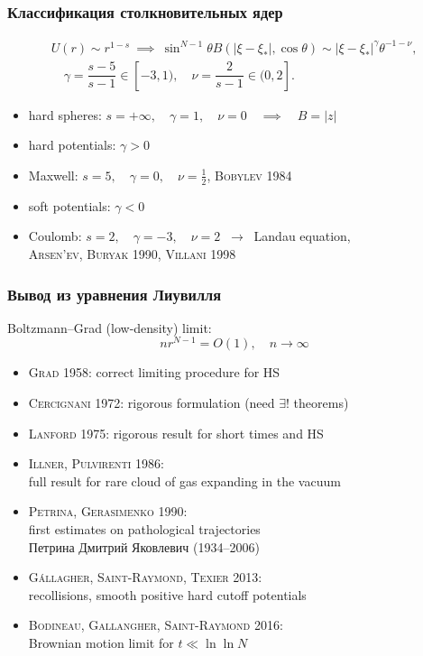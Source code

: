 \documentclass[mathserif]{beamer} %
\newcommand{\OO}[1]{O(#1)}
\newcommand{\Cite}[2][]{\alert{\textsc{#2 #1}}}
\begin{document}
\begin{frame}
    \frametitle{Классификация столкновительных ядер}
    \begin{gather*}
        U(r)\sim r^{1-s} \:\implies\: \sin^{N-1}\theta B(|\xi-\xi_*|,\cos\theta) \sim |\xi-\xi_*|^\gamma \theta^{-1-\nu}, \\
        \quad \gamma = \dfrac{s-5}{s-1}\in[-3,1), \quad \nu = \dfrac2{s-1}\in(0,2].
    \end{gather*}
    \begin{itemize}
        \item hard spheres: \(s=+\infty,\quad\gamma=1,\quad\nu=0 \quad\implies\quad B=|z|\)
        \item hard potentials: \(\gamma>0\)
        \item Maxwell: \(s=5,\quad\gamma=0,\quad\nu=\frac12\), \quad \Cite[1984]{Bobylev}
        \item soft potentials: \(\gamma<0\)
        \item Coulomb: \(s=2,\quad\gamma=-3,\quad\nu=2\) \(\:\longrightarrow\:\) Landau equation,\\
            \Cite[1990]{Arsen'ev, Buryak}, \Cite[1998]{Villani}
    \end{itemize}
\end{frame}

\begin{frame}
    \frametitle{Вывод из уравнения Лиувилля}
    Boltzmann--Grad (low-density) limit: \[ nr^{N-1}=\OO{1}, \quad n\to\infty \]\vspace{-20pt}
    \begin{itemize}
        \item \Cite[1958]{Grad}: correct limiting procedure for HS
        \item \Cite[1972]{Cercignani}: rigorous formulation (need \(\exists!\) theorems)
        \item \Cite[1975]{Lanford}: rigorous result for short times and HS
        \item \Cite[1986]{Illner, Pulvirenti}:\\ full result for rare cloud of gas expanding in the vacuum
        \item \Cite[1990]{Petrina, Gerasimenko}:\\ first estimates on pathological trajectories\\
        {\footnotesize Петрина Дмитрий Яковлевич (1934--2006)}
        \item \Cite[2013]{G\'{a}llagher, Saint-Raymond, Texier}:\\ recollisions, smooth positive hard cutoff potentials
        \item \Cite[2016]{Bodineau, Gallangher, Saint-Raymond}:\\ Brownian motion limit for \(t\ll\ln\ln N\)
    \end{itemize}
\end{frame}
\end{document}
